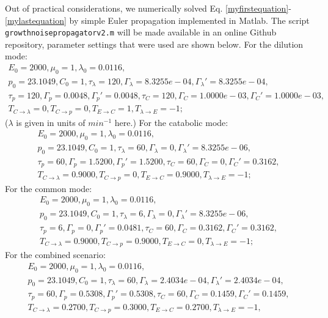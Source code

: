 Out of practical considerations, we numerically solved Eq. \ref{myfirstequation}-\ref{mylastequation} by simple Euler propagation implemented in Matlab.
%
The script \texttt{growthnoisepropagatorv2.m} will be made available in an online Github repository, parameter settings that were used are shown below.
%
For the dilution mode: 
\begin{gather*}
E_0= 2000,
\mu_0= 1,
\lambda_0= 0.0116, 
\nonumber \\ p_0= 23.1049, 
C_0= 1,
\tau_\lambda= 120,
\Gamma_\lambda= 8.3255e-04,
\Gamma_\lambda'= 8.3255e-04,
\nonumber \\ \tau_p= 120,
\Gamma_p= 0.0048,
\Gamma_p'= 0.0048,
\tau_C= 120,
\Gamma_C= 1.0000e-03,
\Gamma_C'= 1.0000e-03,
\nonumber \\ T_{C\rightarrow\lambda}= 0,
T_{C\rightarrow{p}}= 0,
T_{E\rightarrow{C}}= 1,
T_{\lambda\rightarrow{E}}= -1;
\end{gather*}
%
($\lambda$ is given in units of $min^{-1}$ here.)
For the catabolic mode: 
\begin{gather*}
E_0= 2000,
\mu_0= 1,
\lambda_0= 0.0116,
\nonumber \\ p_0= 23.1049,
C_0= 1,
\tau_\lambda= 60,
\Gamma_\lambda= 0,
\Gamma_\lambda'= 8.3255e-06,
\nonumber \\ \tau_p= 60,
\Gamma_p= 1.5200,
\Gamma_p'= 1.5200,
\tau_C= 60,
\Gamma_C= 0,
\Gamma_C'= 0.3162,
\nonumber \\ T_{C\rightarrow\lambda}= 0.9000,
T_{C\rightarrow{p}}= 0,
T_{E\rightarrow{C}}= 0.9000,
T_{\lambda\rightarrow{E}}= -1;
\end{gather*}
For the common mode: 
\begin{gather*}
E_0= 2000,
\mu_0= 1,
\lambda_0= 0.0116,
\nonumber \\p_0= 23.1049,
C_0= 1,
\tau_\lambda= 6,
\Gamma_\lambda= 0,
\Gamma_\lambda'= 8.3255e-06,
\nonumber \\ \tau_p= 6,
\Gamma_p= 0,
\Gamma_p'= 0.0481,
\tau_C= 60,
\Gamma_C= 0.3162,
\Gamma_C'= 0.3162,
\nonumber \\ T_{C\rightarrow\lambda}= 0.9000,
T_{C\rightarrow{p}}= 0.9000,
T_{E\rightarrow{C}}= 0,
T_{\lambda\rightarrow{E}}= -1;
\end{gather*}
For the combined scenario: 
\begin{gather*}
E_0= 2000,
\mu_0= 1,
\lambda_0= 0.0116,
\nonumber \\p_0= 23.1049,
C_0= 1,
\tau_\lambda= 60,
\Gamma_\lambda= 2.4034e-04,
\Gamma_\lambda'= 2.4034e-04,
\nonumber \\ \tau_p= 60,
\Gamma_p= 0.5308,
\Gamma_p'= 0.5308,
\tau_C= 60,
\Gamma_C= 0.1459,
\Gamma_C'= 0.1459,
\nonumber \\ T_{C\rightarrow\lambda}= 0.2700,
T_{C\rightarrow{p}}= 0.3000,
T_{E\rightarrow{C}}= 0.2700,
T_{\lambda\rightarrow{E}}= -1,
\end{gather*}
